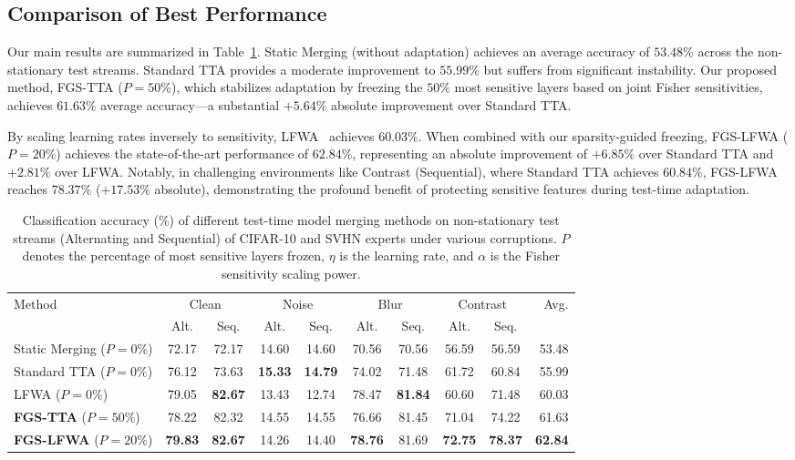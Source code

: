 \documentclass{article}
\theoremstyle{plain}
\theoremstyle{definition}
\theoremstyle{remark}
\begin{document}
\subsection{Comparison of Best Performance}
Our main results are summarized in Table~\ref{tab:main_results}. Static Merging (without adaptation) achieves an average accuracy of $53.48\%$ across the non-stationary test streams. Standard TTA provides a moderate improvement to $55.99\%$ but suffers from significant instability. Our proposed method, FGS-TTA ($P=50\%$), which stabilizes adaptation by freezing the $50\%$ most sensitive layers based on joint Fisher sensitivities, achieves $61.63\%$ average accuracy---a substantial $+5.64\%$ absolute improvement over Standard TTA.

By scaling learning rates inversely to sensitivity, LFWA~\cite{lfwa_anon2026} achieves $60.03\%$. When combined with our sparsity-guided freezing, FGS-LFWA ($P=20\%$) achieves the state-of-the-art performance of $62.84\%$, representing an absolute improvement of $+6.85\%$ over Standard TTA and $+2.81\%$ over LFWA. Notably, in challenging environments like Contrast (Sequential), where Standard TTA achieves $60.84\%$, FGS-LFWA reaches $78.37\%$ ($+17.53\%$ absolute), demonstrating the profound benefit of protecting sensitive features during test-time adaptation.

\begin{table}[t]
\centering
\caption{Classification accuracy (\%) of different test-time model merging methods on non-stationary test streams (Alternating and Sequential) of CIFAR-10 and SVHN experts under various corruptions. $P$ denotes the percentage of most sensitive layers frozen, $\eta$ is the learning rate, and $\alpha$ is the Fisher sensitivity scaling power.}
\label{tab:main_results}
\vskip 0.15in
\begin{small}
\begin{sc}
\begin{tabular}{lccccccccr}
\toprule
Method & \multicolumn{2}{c}{Clean} & \multicolumn{2}{c}{Noise} & \multicolumn{2}{c}{Blur} & \multicolumn{2}{c}{Contrast} & Avg. \\
 & Alt. & Seq. & Alt. & Seq. & Alt. & Seq. & Alt. & Seq. & \\
\midrule
Static Merging ($P=0\%$) & 72.17 & 72.17 & 14.60 & 14.60 & 70.56 & 70.56 & 56.59 & 56.59 & 53.48 \\
Standard TTA ($P=0\%$) & 76.12 & 73.63 & \textbf{15.33} & \textbf{14.79} & 74.02 & 71.48 & 61.72 & 60.84 & 55.99 \\
LFWA ($P=0\%$) & 79.05 & \textbf{82.67} & 13.43 & 12.74 & 78.47 & \textbf{81.84} & 60.60 & 71.48 & 60.03 \\
\midrule
\textbf{FGS-TTA} ($P=50\%$) & 78.22 & 82.32 & 14.55 & 14.55 & 76.66 & 81.45 & 71.04 & 74.22 & 61.63 \\
\textbf{FGS-LFWA} ($P=20\%$) & \textbf{79.83} & \textbf{82.67} & 14.26 & 14.40 & \textbf{78.76} & 81.69 & \textbf{72.75} & \textbf{78.37} & \textbf{62.84} \\
\bottomrule
\end{tabular}
\end{sc}
\end{small}
\vskip -0.1in
\end{table}
\end{document}

